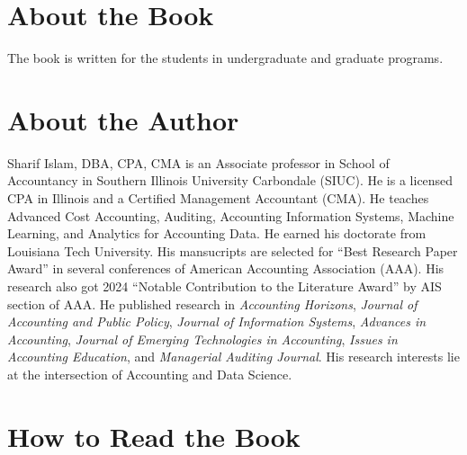 \documentclass[
  letterpaper,
  DIV=11,
  numbers=noendperiod]{scrreprt}
\begin{document}

\chapter*{About the Book}\label{about-the-book}


The book is written for the students in undergraduate and graduate
programs.


\chapter*{About the Author}\label{about-the-author}


Sharif Islam, DBA, CPA, CMA is an Associate professor in School of
Accountancy in Southern Illinois University Carbondale (SIUC). He is a
licensed CPA in Illinois and a Certified Management Accountant (CMA). He
teaches Advanced Cost Accounting, Auditing, Accounting Information
Systems, Machine Learning, and Analytics for Accounting Data. He earned
his doctorate from Louisiana Tech University. His mansucripts are
selected for ``Best Research Paper Award'' in several conferences of
American Accounting Association (AAA). His research also got 2024
``Notable Contribution to the Literature Award'' by AIS section of AAA.
He published research in \emph{Accounting Horizons}, \emph{Journal of
Accounting and Public Policy}, \emph{Journal of Information Systems},
\emph{Advances in Accounting}, \emph{Journal of Emerging Technologies in
Accounting}, \emph{Issues in Accounting Education}, and \emph{Managerial
Auditing Journal}. His research interests lie at the intersection of
Accounting and Data Science.


\chapter*{How to Read the Book}\label{how-to-read-the-book}


\end{document}
